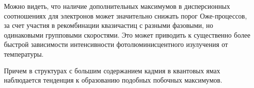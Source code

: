 \documentclass[../main.tex]{subfiles}
\begin{document}
\begin{figure}[h!]
\begin{minipage}[h]{0.3\linewidth}
\begin{center}
                \end{center}
            \end{minipage}
        \end{figure}

        Можно видеть, что наличие дополнительных максимумов в дисперсионных соотношениях для электронов
        может значительно снижать порог Оже-процессов, за счет участия в рекомбинации квазичастиц с разными фазовыми,
        но одинаковыми групповыми скоростями. Это может приводить к существенно более быстрой зависимости
        интенсивности фотолюминисцентного изулучения от температуры.

        Причем в структурах с большим содержанием кадмия в квантовых ямах наблюдается тенденция к образованию
        подобных побочных максимумов. 
    \newpage
\end{document}
